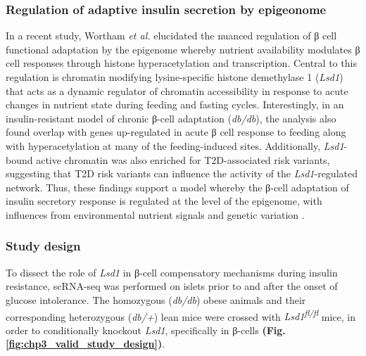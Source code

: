 \subsubsection{\large Regulation of adaptive insulin secretion by epigeonome}

In a recent study, Wortham \textit{et al.} elucidated the nuanced regulation of β cell functional adaptation by the epigenome whereby nutrient availability modulates β cell responses through histone hyperacetylation and transcription. Central to this regulation is chromatin modifying lysine-specific histone demethylase 1 (\textit{Lsd1}) that acts as a dynamic regulator of chromatin accessibility in response to acute changes in nutrient state during feeding and fasting cycles. Interestingly, in an insulin-resistant model of chronic β-cell adaptation (\textit{db/db}), the analysis also found overlap with genes up-regulated in acute β cell response to feeding along with hyperacetylation at many of the feeding-induced sites. Additionally, \textit{Lsd1}-bound active chromatin was also enriched for T2D-associated risk variants, suggesting that T2D risk variants can influence the activity of the \textit{Lsd1}-regulated network. Thus, these findings support a model whereby the β-cell adaptation of insulin secretory response is regulated at the level of the epigenome, with influences from environmental nutrient signals and genetic variation \textbf{\cite{wortham_nutrient_2023,aamodt_peeling_2023}}.


\subsubsection{\large Study design}

To dissect the role of \textit{Lsd1} in β-cell compensatory mechanisms during insulin resistance, scRNA-seq was performed on islets prior to and after the onset of glucose intolerance. The homozygous (\textit{db/db}) obese animals and their corresponding heterozygous (\textit{db/+}) lean mice were crossed with \textit{Lsd1\textsuperscript{fl/fl}} mice, in order to conditionally knockout \textit{Lsd1}, specifically in β-cells \textbf{(Fig. \ref{fig:chp3_valid_study_design})}. 

